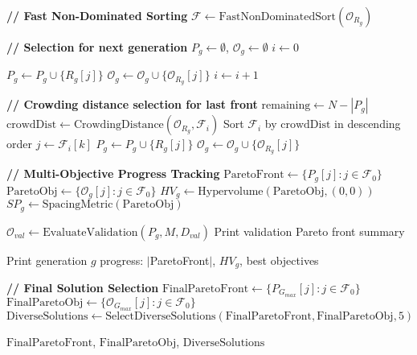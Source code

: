 \documentclass{article}
\begin{document}
\begin{algorithm}
\begin{algorithmic}[1]
    \STATE \textbf{// Fast Non-Dominated Sorting}
    \STATE $\mathcal{F} \leftarrow \text{FastNonDominatedSort}(\mathcal{O}_{R_g})$ 
    
    \STATE \textbf{// Selection for next generation}
    \STATE $P_g \leftarrow \emptyset$, $\mathcal{O}_g \leftarrow \emptyset$
    \STATE $i \leftarrow 0$ 
    
            \STATE $P_g \leftarrow P_g \cup \{R_g[j]\}$
            \STATE $\mathcal{O}_g \leftarrow \mathcal{O}_g \cup \{\mathcal{O}_{R_g}[j]\}$
        \ENDFOR
        \STATE $i \leftarrow i + 1$
    \ENDWHILE
    
        \STATE \textbf{// Crowding distance selection for last front}
        \STATE $\text{remaining} \leftarrow N - |P_g|$
        \STATE $\text{crowdDist} \leftarrow \text{CrowdingDistance}(\mathcal{O}_{R_g}, \mathcal{F}_i)$ 
        \STATE Sort $\mathcal{F}_i$ by $\text{crowdDist}$ in descending order
            \STATE $j \leftarrow \mathcal{F}_i[k]$ 
            \STATE $P_g \leftarrow P_g \cup \{R_g[j]\}$
            \STATE $\mathcal{O}_g \leftarrow \mathcal{O}_g \cup \{\mathcal{O}_{R_g}[j]\}$
        \ENDFOR
    \ENDIF
    
    \STATE \textbf{// Multi-Objective Progress Tracking}
    \STATE $\text{ParetoFront} \leftarrow \{P_g[j] : j \in \mathcal{F}_0\}$
    \STATE $\text{ParetoObj} \leftarrow \{\mathcal{O}_g[j] : j \in \mathcal{F}_0\}$
    \STATE $HV_g \leftarrow \text{Hypervolume}(\text{ParetoObj}, (0,0))$ 
    \STATE $SP_g \leftarrow \text{SpacingMetric}(\text{ParetoObj})$ 
    
     
        \STATE $\mathcal{O}_{val} \leftarrow \text{EvaluateValidation}(P_g, M, D_{val})$
        \STATE Print validation Pareto front summary
    \ENDIF
    
    \STATE Print generation $g$ progress: $|$ParetoFront$|$, $HV_g$, best objectives
    
\ENDFOR

\STATE \textbf{// Final Solution Selection}
\STATE $\text{FinalParetoFront} \leftarrow \{P_{G_{max}}[j] : j \in \mathcal{F}_0\}$
\STATE $\text{FinalParetoObj} \leftarrow \{\mathcal{O}_{G_{max}}[j] : j \in \mathcal{F}_0\}$
\STATE $\text{DiverseSolutions} \leftarrow \text{SelectDiverseSolutions}(\text{FinalParetoFront}, \text{FinalParetoObj}, 5)$

\RETURN $\text{FinalParetoFront}$, $\text{FinalParetoObj}$, $\text{DiverseSolutions}$

\end{algorithmic}
\end{algorithm}
\end{document}

